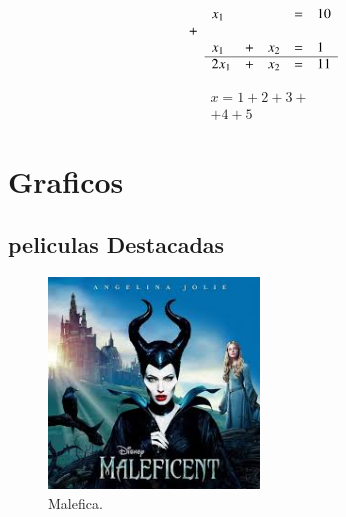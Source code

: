 \documentclass[12pt,letterpaper]{article}
\begin{document}
\begin{equation}
\begin{array}{llllll}
& x_1 &&& = & 10 \\
+ \\
& x_1 & + & x_2 & = & 1\\
\cline{2-6}
& 2x_1 & + & x_2 & = & 11
\end{array}
\end{equation}


\begin{eqnarray}
\nonumber x = 1 + 2 + 3 + \\
+ 4 + 5
\end{eqnarray}





\newpage

\section{Graficos} 
\subsection{peliculas Destacadas}

\begin{figure}[htb]
\centering
\includegraphics[width=0.5\textwidth]{./imagenes/1}
\caption{Malefica.} \label{ima:1}
\end{figure}
\end{document}
